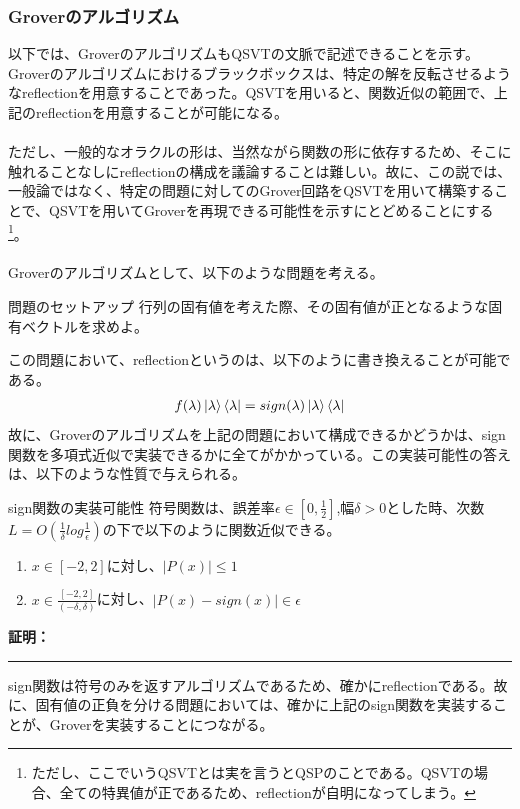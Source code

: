 \documentclass[a4paper,10.5pt]{article}
\numberwithin{equation}{section}
\newenvironment{proofbox}
{\begin{prooflabel}\textbf{証明：}\end{prooflabel}\vspace{0.8em}}
{\par\vspace{1em}\hrule\vspace{1em}}
\begin{document}
\subsubsection{Groverのアルゴリズム}
以下では、GroverのアルゴリズムもQSVTの文脈で記述できることを示す。Groverのアルゴリズムにおけるブラックボックスは、特定の解を反転させるようなreflectionを用意することであった。QSVTを用いると、関数近似の範囲で、上記のreflectionを用意することが可能になる。\\
\\
ただし、一般的なオラクルの形は、当然ながら関数の形に依存するため、そこに触れることなしにreflectionの構成を議論することは難しい。故に、この説では、一般論ではなく、特定の問題に対してのGrover回路をQSVTを用いて構築することで、QSVTを用いてGroverを再現できる可能性を示すにとどめることにする\footnote{ただし、ここでいうQSVTとは実を言うとQSPのことである。QSVTの場合、全ての特異値が正であるため、reflectionが自明になってしまう。}。\\
\\
Groverのアルゴリズムとして、以下のような問題を考える。
\begin{problembox}{問題のセットアップ}
    行列の固有値を考えた際、その固有値が正となるような固有ベクトルを求めよ。
\end{problembox}
この問題において、reflectionというのは、以下のように書き換えることが可能である。
\begin{align*}
    f(\lambda)\ket{\lambda}\bra{\lambda}=sign(\lambda)\ket{\lambda}\bra{\lambda}
\end{align*}
故に、Groverのアルゴリズムを上記の問題において構成できるかどうかは、sign関数を多項式近似で実装できるかに全てがかかっている。この実装可能性の答えは、以下のような性質で与えられる。
\begin{theorembox}{sign関数の実装可能性}
符号関数は、誤差率$\epsilon\in [0,\frac{1}{2}]$,幅$\delta>0$とした時、次数$L=O(\frac{1}{\delta}log\frac{1}{\epsilon})$の下で以下のように関数近似できる。
\begin{enumerate}
    \item $x\in[-2,2]$に対し、$|P(x)|\leq 1$\\
    \item $x\in\frac{[-2,2]}{(-\delta,\delta)}$に対し、$|P(x)-sign(x)|\in \epsilon$
\end{enumerate}
\end{theorembox}
\begin{proofbox}
    
\end{proofbox}
sign関数は符号のみを返すアルゴリズムであるため、確かにreflectionである。故に、固有値の正負を分ける問題においては、確かに上記のsign関数を実装することが、Groverを実装することにつながる。
\end{document}
